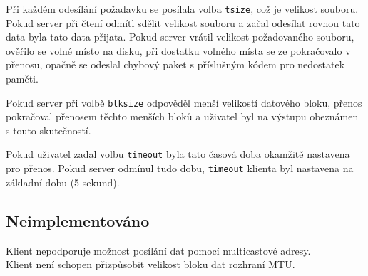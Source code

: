 \documentclass[11pt]{article}
\begin{document}
Při každém odesílání požadavku se posílala volba \texttt{tsize}, což je velikost souboru. Pokud server při čtení odmítl sdělit velikost souboru a začal 
odesílat rovnou tato data byla tato data přijata. Pokud server vrátil velikost požadovaného souboru, ověřilo se volné místo na disku, při dostatku
volného místa se ze pokračovalo v přenosu, opačně se odeslal chybový paket s příslušným kódem pro nedostatek paměti.

Pokud server při volbě \texttt{blksize} odpověděl menší velikostí datového bloku, přenos pokračoval přenosem těchto menších bloků a uživatel
byl na výstupu obeznámen s touto skutečností.

Pokud uživatel zadal volbu \texttt{timeout} byla tato časová doba okamžitě nastavena pro přenos. Pokud server odmínul tudo dobu, \texttt{timeout}
klienta byl nastavena na základní dobu (5 sekund).

\subsection{Neimplementováno}
Klient nepodporuje možnost posílání dat pomocí multicastové adresy. \\
Klient není schopen přizpůsobit velikost bloku dat rozhraní MTU.

\newpage
 
\renewcommand{\refname}{Literatura}

\end{document}
